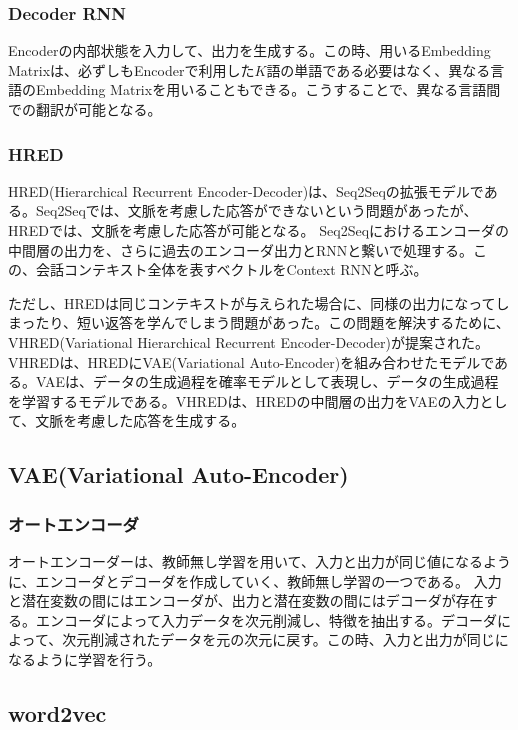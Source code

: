 \documentclass{ltjsarticle}
\begin{document}
\subsubsection{Decoder RNN}
Encoderの内部状態を入力して、出力を生成する。この時、用いるEmbedding Matrixは、必ずしもEncoderで利用した$K$語の単語である必要はなく、異なる言語のEmbedding Matrixを用いることもできる。こうすることで、異なる言語間での翻訳が可能となる。

\subsubsection{HRED}
HRED(Hierarchical Recurrent Encoder-Decoder)は、Seq2Seqの拡張モデルである。Seq2Seqでは、文脈を考慮した応答ができないという問題があったが、HREDでは、文脈を考慮した応答が可能となる。
Seq2Seqにおけるエンコーダの中間層の出力を、さらに過去のエンコーダ出力とRNNと繋いで処理する。この、会話コンテキスト全体を表すベクトルをContext RNNと呼ぶ。
\par
ただし、HREDは同じコンテキストが与えられた場合に、同様の出力になってしまったり、短い返答を学んでしまう問題があった。この問題を解決するために、VHRED(Variational Hierarchical Recurrent Encoder-Decoder)が提案された。VHREDは、HREDにVAE(Variational Auto-Encoder)を組み合わせたモデルである。VAEは、データの生成過程を確率モデルとして表現し、データの生成過程を学習するモデルである。VHREDは、HREDの中間層の出力をVAEの入力として、文脈を考慮した応答を生成する。

\subsection{VAE(Variational Auto-Encoder)}
\subsubsection{オートエンコーダ}
オートエンコーダーは、教師無し学習を用いて、入力と出力が同じ値になるように、エンコーダとデコーダを作成していく、教師無し学習の一つである。
入力と潜在変数の間にはエンコーダが、出力と潜在変数の間にはデコーダが存在する。エンコーダによって入力データを次元削減し、特徴を抽出する。デコーダによって、次元削減されたデータを元の次元に戻す。この時、入力と出力が同じになるように学習を行う。

\subsection{word2vec}
\end{document}
